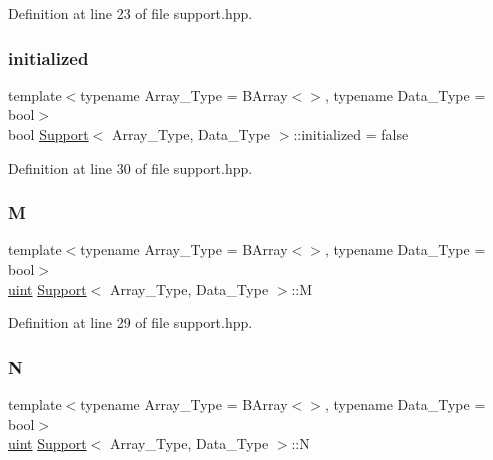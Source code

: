 Definition at line 23 of file support.\+hpp.

\mbox{\label{class_support_ac352c6473720fcdcd9895c48bd872ef5}} 
\subsubsection{\texorpdfstring{initialized}{initialized}}
{\footnotesize\ttfamily template$<$typename Array\+\_\+\+Type  = B\+Array$<$$>$, typename Data\+\_\+\+Type  = bool$>$ \\
bool \hyperlink{class_support}{Support}$<$ Array\+\_\+\+Type, Data\+\_\+\+Type $>$\+::initialized = false}



Definition at line 30 of file support.\+hpp.

\mbox{\label{class_support_ace1d46b871c67caa774ac2269930e97f}} 
\subsubsection{\texorpdfstring{M}{M}}
{\footnotesize\ttfamily template$<$typename Array\+\_\+\+Type  = B\+Array$<$$>$, typename Data\+\_\+\+Type  = bool$>$ \\
\hyperlink{typedefs_8hpp_a91ad9478d81a7aaf2593e8d9c3d06a14}{uint} \hyperlink{class_support}{Support}$<$ Array\+\_\+\+Type, Data\+\_\+\+Type $>$\+::M}



Definition at line 29 of file support.\+hpp.

\mbox{\label{class_support_ab15c7125d6b99ae15ec4dbb34c9ce9b6}} 
\subsubsection{\texorpdfstring{N}{N}}
{\footnotesize\ttfamily template$<$typename Array\+\_\+\+Type  = B\+Array$<$$>$, typename Data\+\_\+\+Type  = bool$>$ \\
\hyperlink{typedefs_8hpp_a91ad9478d81a7aaf2593e8d9c3d06a14}{uint} \hyperlink{class_support}{Support}$<$ Array\+\_\+\+Type, Data\+\_\+\+Type $>$\+::N}



